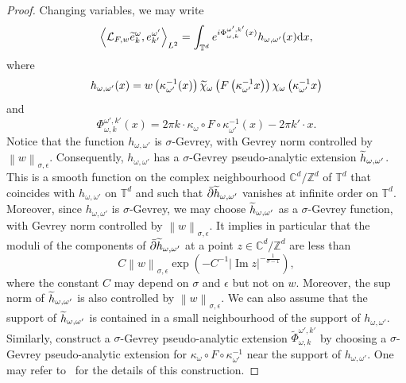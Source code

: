 \documentclass[10pt]{amsart}
\theoremstyle{definition}\newtheorem{defi}[theo]{Definition}\newtheorem{rema}[theo]{Remark}\newtheorem{exam}[theo]{Example}\newtheorem{exem}[theo]{Example}\newtheorem{nota}[theo]{Notation}
\DeclareMathOperator{\im}{Im}
\newcommand{\p}[1]{\left(#1\right)}
\newcommand{\n}[1]{\left\|#1\right\|}
\newcommand{\va}[1]{\left|#1\right|}
\newcommand{\clL}{\mathcal{L}}
\newcommand{\bbZ}{\mathbb{Z}}
\newcommand{\bbC}{\mathbb{C}}
\newcommand{\bbT}{\mathbb{T}}
\newcommand{\rmd}{\mathrm{d}}
\let\oldtilde\tilde
\renewcommand*{\tilde}[1]{\mathchoice{\widetilde{#1}}{\widetilde{#1}}{\oldtilde{#1}}{\oldtilde{#1}}}
\begin{document}
\begin{proof}
Changing variables, we may write
\begin{equation}\label{eq:in_the_chart}
\left\langle \clL_{F,w} \tilde{e}_{k}^{\omega}, e_{k'}^{\omega'}\right\rangle_{L^2} = \int_{\bbT^d} e^{i \Phi_{\omega,k}^{\omega',k'} (x)} h_{\omega,\omega'}(x) \rmd x,
\end{equation}
where
\begin{equation*}
h_{\omega,\omega'}(x) = w\left(\kappa_{\omega'}^{-1}(x)\right)\tilde{\chi}_{\omega}\left(F\left(\kappa_{\omega'}^{-1} x\right)\right) \chi_\omega\left(\kappa_{\omega'}^{-1}x\right)
\end{equation*}
and
\begin{equation*}
\Phi_{\omega,k}^{\omega',k'}(x) = 2 \pi k \cdot \kappa_{\omega} \circ F \circ \kappa_{\omega'}^{-1}(x) - 2 \pi k' \cdot x.
\end{equation*}
Notice that the function $h_{\omega,\omega'}$ is $\sigma$-Gevrey, with Gevrey norm controlled by $\n{w}_{\sigma,\epsilon}$. Consequently, $h_{\omega,\omega'}$ has a $\sigma$-Gevrey pseudo-analytic extension $\tilde{h}_{\omega,\omega'}$. This is a smooth function on the complex neighbourhood $\bbC^d / \bbZ^d$ of $\bbT^d$ that coincides with $h_{\omega,\omega'}$ on $\bbT^d$ and such that $\bar{\partial} \tilde{h}_{\omega,\omega'}$ vanishes at infinite order on $\bbT^d$. Moreover, since $h_{\omega,\omega'}$ is $\sigma$-Gevrey, we may choose $\tilde{h}_{\omega,\omega'}$ as a $\sigma$-Gevrey function, with Gevrey norm controlled by $\n{w}_{\sigma,\epsilon}$. It implies in particular that the moduli of the components of $\bar{\partial} \tilde{h}_{\omega,\omega'}$ at a point $z \in \bbC^d / \bbZ^d$ are less than
\begin{equation}\label{eq:bound_dbar}
C \n{w}_{\sigma,\epsilon} \exp\p{ - C^{-1} \va{\im z}^{- \frac{1}{\sigma - 1}}},
\end{equation}
where the constant $C$ may depend on $\sigma$ and $\epsilon$ but not on $w$. Moreover, the sup norm of $\tilde{h}_{\omega,\omega'}$ is also controlled by $\n{w}_{\sigma,\epsilon}$. We can also assume that the support of $\tilde{h}_{\omega,\omega'}$ is contained in a small neighbourhood of the support of $h_{\omega,\omega'}$. Similarly, construct a $\sigma$-Gevrey pseudo-analytic extension $\widetilde{\Phi}_{\omega,k}^{\omega',k'}$ by choosing a $\sigma$-Gevrey pseudo-analytic extension for $\kappa_\omega \circ F \circ \kappa_{\omega'}^{-1}$ near the support of $h_{\omega,\omega'}$. One may refer to~\cite[\S 1.1.1.3]{BJ20} for the details of this construction.


\end{proof}
\end{document}
